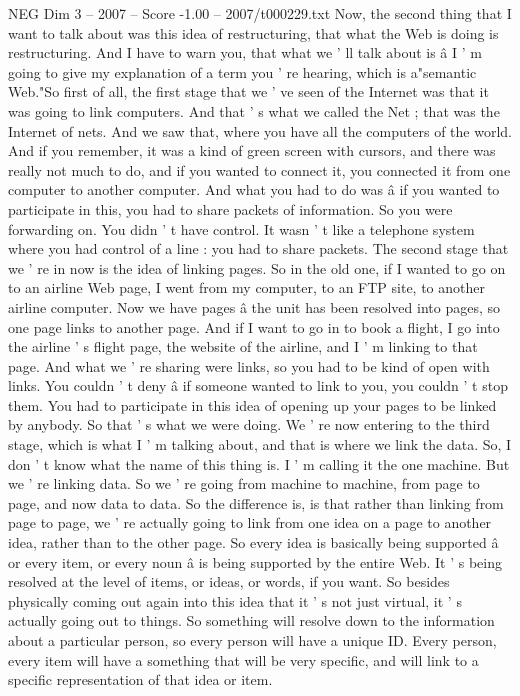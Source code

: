 \begin{textsample}{NEG Dim 3 – 2007 – Score -1.00 – 2007/t000229.txt}
Now, the second thing that I want to talk about was this idea of restructuring, that what the Web is doing is restructuring.
And I have to warn you, that what we ' ll talk about is â I ' m going to give my explanation of a term you ' re hearing, which is a"semantic Web."So first of all, the first stage that we ' ve seen of the Internet was that it was going to link computers.
And that ' s what we called the Net ; that was the Internet of nets.
And we saw that, where you have all the computers of the world.
And if you remember, it was a kind of green screen with cursors, and there was really not much to do, and if you wanted to connect it, you connected it from one computer to another computer.
And what you had to do was â if you wanted to participate in this, you had to share packets of information.
So you were forwarding on.
You didn ' t have control.
It wasn ' t like a telephone system where you had control of a line : you had to share packets.
The second stage that we ' re in now is the idea of linking pages.
So in the old one, if I wanted to go on to an airline Web page, I went from my computer, to an FTP site, to another airline computer.
Now we have pages â the unit has been resolved into pages, so one page links to another page.
And if I want to go in to book a flight, I go into the airline ' s flight page, the website of the airline, and I ' m linking to that page.
And what we ' re sharing were links, so you had to be kind of open with links.
You couldn ' t deny â if someone wanted to link to you, you couldn ' t stop them.
You had to participate in this idea of opening up your pages to be linked by anybody.
So that ' s what we were doing.
We ' re now entering to the third stage, which is what I ' m talking about, and that is where we link the data.
So, I don ' t know what the name of this thing is.
I ' m calling it the one machine.
But we ' re linking data.
So we ' re going from machine to machine, from page to page, and now data to data.
So the difference is, is that rather than linking from page to page, we ' re actually going to link from one idea on a page to another idea, rather than to the other page.
So every idea is basically being supported â or every item, or every noun â is being supported by the entire Web.
It ' s being resolved at the level of items, or ideas, or words, if you want.
So besides physically coming out again into this idea that it ' s not just virtual, it ' s actually going out to things.
So something will resolve down to the information about a particular person, so every person will have a unique ID.
Every person, every item will have a something that will be very specific, and will link to a specific representation of that idea or item.

\end{textsample}
